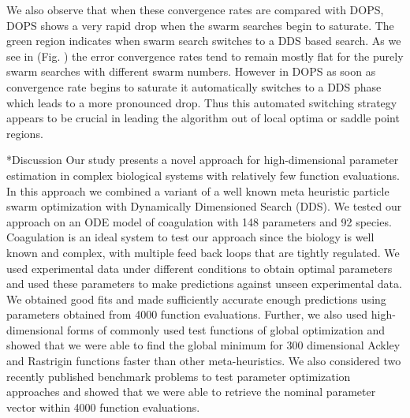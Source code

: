 \documentclass[12pt]{article}
\makeatletter
\renewcommand\section{\@startsection
	{subsection}{2}{0mm}
	{-0.2in}
	{0.05\baselineskip}
	{\normalfont\large\bfseries}}
\makeatother
\begin{document}
We also observe that when these convergence rates are compared with DOPS, DOPS shows a very rapid drop when the swarm searches begin to saturate. The green region indicates when swarm search switches to a DDS based search. As we see in (Fig. ) the error convergence rates tend to remain mostly flat for the purely swarm searches with different swarm numbers. However in DOPS as soon as convergence rate begins to saturate it automatically switches to a DDS phase which leads to a more pronounced drop. Thus this automated switching strategy appears to be crucial in leading the algorithm out of local optima or saddle point regions. 
 
\clearpage
\section*{Discussion}
Our study presents a novel approach for high-dimensional parameter estimation in complex biological systems with relatively few function evaluations. In this approach we combined a variant of a well known meta heuristic particle swarm optimization with Dynamically Dimensioned Search (DDS). We tested our approach on an ODE model of coagulation with 148 parameters and 92 species. Coagulation is an ideal system to test our approach since the biology is well known and complex, with multiple feed back loops that are tightly regulated. We used experimental data under different conditions to obtain optimal parameters and used these parameters to make predictions against unseen experimental data. We obtained good fits and made sufficiently accurate enough predictions using parameters obtained from 4000 function evaluations. Further, we also used high-dimensional forms of commonly used test functions of global optimization and showed that we were able to find the global minimum for 300 dimensional Ackley and Rastrigin functions faster than other meta-heuristics. We also considered two recently published benchmark problems to test parameter optimization approaches and showed that we were able to retrieve the nominal parameter vector within 4000 function evaluations.
\end{document}
